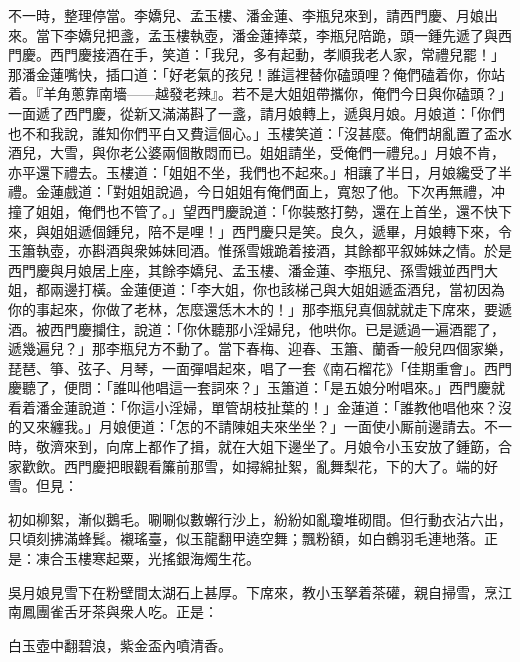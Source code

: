 不一時，整理停當。李嬌兒、孟玉樓、潘金蓮、李瓶兒來到，請西門慶、月娘出來。當下李嬌兒把盞，孟玉樓執壺，潘金蓮捧菜，李瓶兒陪跪，頭一鍾先遞了與西門慶。西門慶接酒在手，笑道：「我兒，多有起動，孝順我老人家，常禮兒罷！」那潘金蓮嘴快，插口道：「好老氣的孩兒！誰這裡替你磕頭哩？俺們磕着你，你站着。『羊角蔥靠南墻——越發老辣』。若不是大姐姐帶攜你，俺們今日與你磕頭？」一面遞了西門慶，從新又滿滿斟了一盞，請月娘轉上，遞與月娘。月娘道：「你們也不和我說，誰知你們平白又費這個心。」玉樓笑道：「沒甚麼。俺們胡亂置了盃水酒兒，大雪，與你老公婆兩個散悶而已。姐姐請坐，受俺們一禮兒。」月娘不肯，亦平還下禮去。玉樓道：「姐姐不坐，我們也不起來。」相讓了半日，月娘纔受了半禮。金蓮戲道：「對姐姐說過，今日姐姐有俺們面上，寬恕了他。下次再無禮，冲撞了姐姐，俺們也不管了。」{}望西門慶說道：「你裝憨打勢，還在上首坐，還不快下來，與姐姐遞個鍾兒，陪不是哩！」西門慶只是笑。良久，遞畢，月娘轉下來，令玉簫執壺，亦斟酒與衆姊妹囘酒。惟孫雪娥跪着接酒，其餘都平叙姊妹之情。於是西門慶與月娘居上座，其餘李嬌兒、孟玉樓、潘金蓮、李瓶兒、孫雪娥並西門大姐，都兩邊打橫。金蓮便道：「李大姐，你也該梯己與大姐姐遞盃酒兒，當初因為你的事起來，你做了老林，怎麼還恁木木的！」{}那李瓶兒真個就就走下席來，要遞酒。{}被西門慶攔住，說道：「你休聽那小淫婦兒，他哄你。{}已是遞過一遍酒罷了，遞幾遍兒？」那李瓶兒方不動了。當下春梅、迎春、玉簫、蘭香一般兒四個家樂，琵琶、箏、弦子、月琴，一面彈唱起來，唱了一套《南石榴花》「佳期重會」。{}西門慶聽了，便問：「誰叫他唱這一套詞來？」玉簫道：「是五娘分咐唱來。」西門慶就看着潘金蓮說道：{}「你這小淫婦，單管胡枝扯葉的！」金蓮道：「誰教他唱他來？沒的又來纏我。」月娘便道：「怎的不請陳姐夫來坐坐？」一面使小厮前邊請去。不一時，敬濟來到，向席上都作了揖，就在大姐下邊坐了。月娘令小玉安放了鍾筯，合家歡飲。西門慶把眼觀看簾前那雪，如撏綿扯絮，亂舞梨花，下的大了。端的好雪。但見：

\begin{myquote} 
初如柳絮，漸似鵝毛。唰唰似數蠏行沙上，紛紛如亂瓊堆砌間。但行動衣沾六出，只頃刻拂滿蜂鬂。襯瑤臺，似玉龍翻甲遶空舞；飄粉額，如白鶴羽毛連地落。正是：凍合玉樓寒起粟，光搖銀海燭生花。
\end{myquote} 

吳月娘見雪下在粉壁間太湖石上甚厚。下席來，教小玉拏着茶礶，親自掃雪，烹江南鳳團雀舌牙茶與衆人吃。正是：

\begin{myquote} 
白玉壺中翻碧浪，紫金盃內噴清香。
\end{myquote} 

